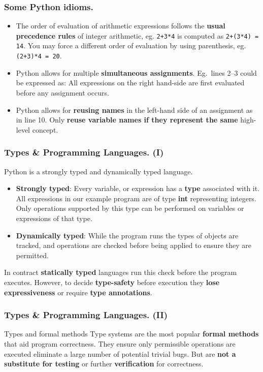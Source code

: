 \documentclass{beamer} %
\newcommand\emc[1]{\textcolor{brightblue}{\textbf{#1}}}
\begin{document}
\begin{frame}
\frametitle{Some Python idioms.}

\begin{itemize}
	\item The order of evaluation of arithmetic expressions follows the \emc{usual precedence rules} of integer arithmetic, eg. \texttt{2+3*4} is computed as \texttt{2+(3*4) = 14}. You may force a different order of evaluation by using parenthesis, eg. \texttt{(2+3)*4 = 20}.
	\item Python allows for multiple \emc{simultaneous assignments}. Eg.\ lines 2--3 could be expressed as:
	All expressions on the right hand-side are first evaluated before any assignment occurs.
	\item Python allows for \emc{reusing names} in the left-hand side of an assignment as in line 10.
	Only \emc{reuse variable names if they represent the same} high-level concept.

\end{itemize}

\end{frame}


\begin{frame}
\frametitle{Types \& Programming Languages. (I)}

Python is a strongly typed and dynamically typed language. 
\begin{itemize}
\item \emc{Strongly typed}: Every variable, or expression has a \emc{type} associated with it. All expressions in our example program are of type \emc{int} representing integers. Only operations supported by this type can be performed on variables or expressions of that type.
\item \emc{Dynamically typed}: While the program runs the types of objects are tracked, and operations are checked before being applied to ensure they are permitted. 
\end{itemize}

\vspace{5mm}
In contract \emc{statically typed} languages run this check before the program executes. However, to decide \emc{type-safety} before execution they \emc{lose expressiveness} or require \emc{type annotations}.

\end{frame}

\begin{frame}
\frametitle{Types \& Programming Languages. (II)}

\begin{block}{Types and formal methods}
Type systems are the most popular \emc{formal methods} that aid program correctness. They ensure only permissible operations are executed eliminate a large number of potential trivial bugs. But are \emc{not a substitute for testing} or further \emc{verification} for correctness.
\end{block}

\end{frame}
\end{document}
